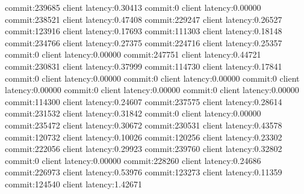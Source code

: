 commit:239685 client latency:0.30413
commit:0 client latency:0.00000
commit:238521 client latency:0.47408
commit:229247 client latency:0.26527
commit:123916 client latency:0.17693
commit:111303 client latency:0.18148
commit:234766 client latency:0.27375
commit:224716 client latency:0.25357
commit:0 client latency:0.00000
commit:247751 client latency:0.44721
commit:230831 client latency:0.37999
commit:114730 client latency:0.17841
commit:0 client latency:0.00000
commit:0 client latency:0.00000
commit:0 client latency:0.00000
commit:0 client latency:0.00000
commit:0 client latency:0.00000
commit:114300 client latency:0.24607
commit:237575 client latency:0.28614
commit:231532 client latency:0.31842
commit:0 client latency:0.00000
commit:235472 client latency:0.30672
commit:230531 client latency:0.43578
commit:120732 client latency:0.10026
commit:120256 client latency:0.23302
commit:222056 client latency:0.29923
commit:239760 client latency:0.32802
commit:0 client latency:0.00000
commit:228260 client latency:0.24686
commit:226973 client latency:0.53976
commit:123273 client latency:0.11359
commit:124540 client latency:1.42671
